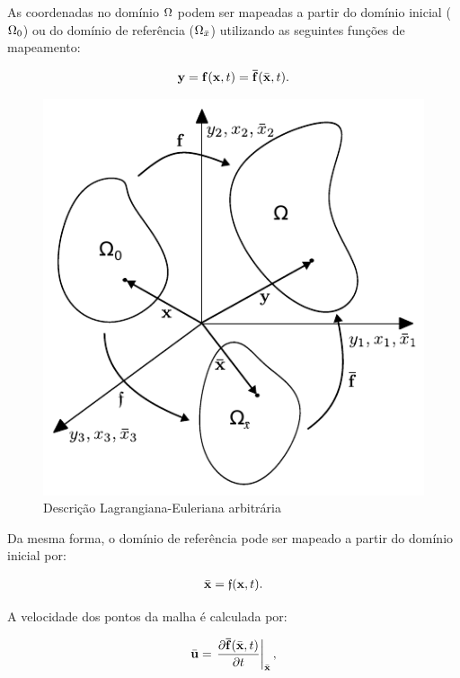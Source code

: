 As coordenadas no domínio $\Omega$ podem ser mapeadas a partir do domínio inicial ($\Omega_{0}$) ou do domínio de referência ($\Omega_{\bar{x}}$) utilizando as seguintes funções de mapeamento:  

\begin{align}
	\mathbf{y} = \mathbf{f}(\mathbf{x},t) = \mathbf{\bar{f}}(\bar{\mathbf{x}},t).
\end{align}

\begin{figure}[!htbp]
	\caption{Descrição Lagrangiana-Euleriana arbitrária}
	\begin{center}
	\includegraphics[scale=1.0]{Imagens/Cap2/dominioALE.pdf}	
	\end{center}
	\label{fig:dominioAle}
\end{figure}

Da mesma forma, o domínio de referência pode ser mapeado a partir do domínio inicial por:

\begin{align}
	\bar{\mathbf{x}} = \mathfrak{f}(\mathbf{x},t).
\end{align}

A velocidade dos pontos da malha é calculada por:

\begin{align}
	\bar{\mathbf{u}} = \left. \frac{\partial \mathbf{\bar{f}}(\bar{\mathbf{x}},t)}{\partial t} \right|_{\bar{\mathbf{x}}},
\end{align}

